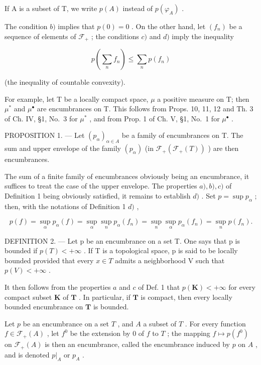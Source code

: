 If A is a subset of T, we write \(p(A)\) instead of \(p(\varphi_A)\) .

The condition \(b)\) implies that \(p(0) = 0\) . On the other hand, let \((f_n)\) be a sequence of elements of \(\mathcal{F}_+\) ; the conditions \(c)\) and \(d)\) imply the inequality

\[
p \left(\sum_ {n} f _ {n}\right) \leqslant \sum_ {n} p (f _ {n})
\]

(the inequality of countable convexity).

For example, let T be a locally compact space, \(\mu\) a positive measure on T; then \(\mu^{*}\) and \(\mu^{\bullet}\) are encumbrances on T. This follows from Props. 10, 11, 12 and Th. 3 of Ch. IV, §1, No.~3 for \(\mu^{*}\) , and from Prop. 1 of Ch. V, §1, No.~1 for \(\mu^{\bullet}\) .

PROPOSITION 1. --- Let \((p_{\alpha})_{\alpha \in A}\) be a family of encumbrances on T. The sum and upper envelope of the family \((p_{\alpha})\) (in \(\mathcal{F}_{+}(\mathcal{F}_{+}(T))\) ) are then encumbrances.

The sum of a finite family of encumbrances obviously being an encumbrance, it suffices to treat the case of the upper envelope. The properties \(a), b), c)\) of Definition 1 being obviously satisfied, it remains to establish \(d)\) . Set \(p = \sup p_{\alpha}\) ; then, with the notations of Definition 1 \(d)\) ,

\[
p (f) = \sup _ {\alpha} p _ {\alpha} (f) = \sup _ {\alpha} \sup _ {n} p _ {\alpha} (f _ {n}) = \sup _ {n} \sup _ {\alpha} p _ {\alpha} (f _ {n}) = \sup _ {n} p (f _ {n}).
\]

DEFINITION 2. --- Let p be an encumbrance on a set T. One says that p is bounded if \(p(T) < +\infty\) . If T is a topological space, p is said to be locally bounded provided that every \(x \in T\) admits a neighborhood V such that \(p(V) < +\infty\) .

It then follows from the properties \(a\) and \(c\) of Def. 1 that \(p(\mathbf{K}) < +\infty\) for every compact subset \(\mathbf{K}\) of \(\mathbf{T}\) . In particular, if \(\mathbf{T}\) is compact, then every locally bounded encumbrance on \(\mathbf{T}\) is bounded.

Let \(p\) be an encumbrance on a set \(T\) , and \(A\) a subset of \(T\) . For every function \(f \in \mathcal{F}_{+}(A)\) , let \(f^0\) be the extension by 0 of \(f\) to \(T\) ; the mapping \(f \mapsto p(f^0)\) on \(\mathcal{F}_{+}(A)\) is then an encumbrance, called the encumbrance induced by \(p\) on \(A\) , and is denoted \(p|_{A}\) or \(p_A\) .

